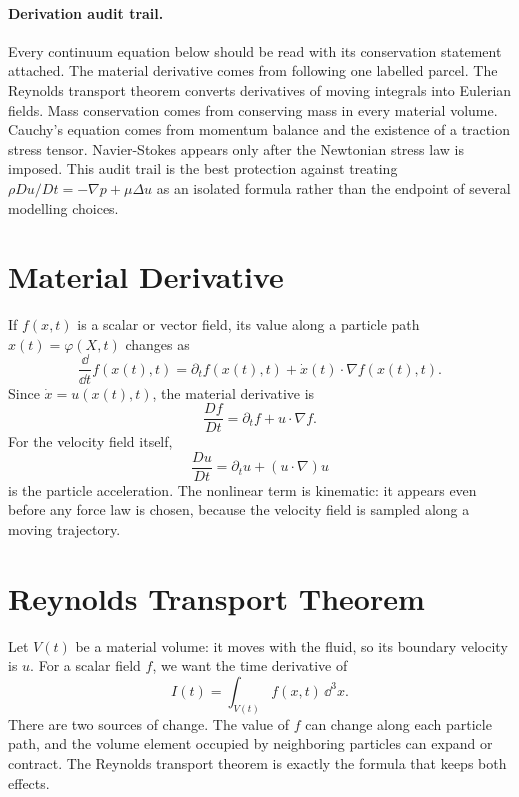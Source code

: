 \paragraph{Derivation audit trail.}
Every continuum equation below should be read with its conservation statement
attached. The material derivative comes from following one labelled parcel.
The Reynolds transport theorem converts derivatives of moving integrals into
Eulerian fields. Mass conservation comes from conserving mass in every material
volume. Cauchy's equation comes from momentum balance and the existence of a
traction stress tensor. Navier-Stokes appears only after the Newtonian stress
law is imposed. This audit trail is the best protection against treating
\(\rho Du/Dt=-\nabla p+\mu\Delta u\) as an isolated formula rather than the
endpoint of several modelling choices.

\section{Material Derivative}
\label{sec:material-derivative}

If \(f(x,t)\) is a scalar or vector field, its value along a particle path
\(x(t)=\varphi(X,t)\) changes as
\[
  \frac{\dd}{\dd t}f(x(t),t)
  =
  \partial_t f(x(t),t)+\dot x(t)\cdot\nabla f(x(t),t).
\]
Since \(\dot x=u(x(t),t)\), the material derivative is
\[
  \boxed{
  \frac{D f}{D t}
  =
  \partial_t f+u\cdot\nabla f.
  }
\]
For the velocity field itself,
\[
  \frac{D u}{D t}
  =
  \partial_tu+(u\cdot\nabla)u
\]
is the particle acceleration. The nonlinear term is kinematic: it appears even
before any force law is chosen, because the velocity field is sampled along a
moving trajectory.

\section{Reynolds Transport Theorem}
\label{sec:reynolds-transport}

Let \(V(t)\) be a material volume: it moves with the fluid, so its boundary
velocity is \(u\). For a scalar field \(f\), we want the time derivative of
\[
  I(t)=\int_{V(t)} f(x,t)\,\dd^3x.
\]
There are two sources of change. The value of \(f\) can change along each
particle path, and the volume element occupied by neighboring particles can
expand or contract. The Reynolds transport theorem is exactly the formula that
keeps both effects.

